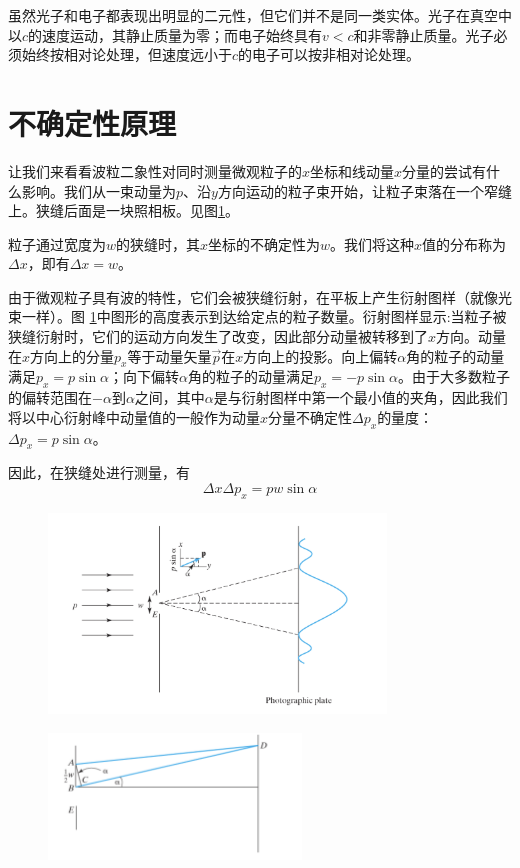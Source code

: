 	虽然光子和电子都表现出明显的二元性，但它们并不是同一类实体。光子在真空中以$c$的速度运动，其静止质量为零；而电子始终具有$v<c$和非零静止质量。光子必须始终按相对论处理，但速度远小于$c$的电子可以按非相对论处理。
	
	\section{不确定性原理}
	\label{sec:1.3 The Uncertainty Principle}
	让我们来看看波粒二象性对同时测量微观粒子的$x$坐标和线动量$x$分量的尝试有什么影响。我们从一束动量为$p$、沿$y$方向运动的粒子束开始，让粒子束落在一个窄缝上。狭缝后面是一块照相板。见图\ref{fig:1.1}。

	粒子通过宽度为$w$的狭缝时，其$x$坐标的不确定性为$w$。我们将这种$x$值的分布称为$\Delta x$，即有$\Delta x = w$。

	由于微观粒子具有波的特性，它们会被狭缝衍射，在平板上产生衍射图样（就像光束一样）。图 \ref{fig:1.1}中图形的高度表示到达给定点的粒子数量。衍射图样显示:当粒子被狭缝衍射时，它们的运动方向发生了改变，因此部分动量被转移到了$x$方向。动量在$x$方向上的分量$p_x$等于动量矢量$\overrightarrow{p}$在$x$方向上的投影。向上偏转$\alpha$角的粒子的动量满足$p_x=p\sin \alpha$；向下偏转$\alpha$角的粒子的动量满足$p_x=-p \sin \alpha$。由于大多数粒子的偏转范围在$-\alpha$到$\alpha$之间，其中$\alpha$是与衍射图样中第一个最小值的夹角，因此我们将以中心衍射峰中动量值的一般作为动量$x$分量不确定性$\Delta p_x$的量度：$\Delta p_x = p \sin \alpha$。

	因此，在狭缝处进行测量，有
	\begin{equation}
		\Delta x \Delta p_x = pw \sin \alpha 
		\label{eq:1.6 diffract equation on x}
	\end{equation}
	
	\begin{figure}[h!]
		\centering
		\includegraphics[width=0.8\textwidth]{Figures/1.1.png}  %
		\caption{}
		\label{fig:1.1}
	\end{figure}
	\begin{figure}[h!]
		\centering
		\includegraphics[width=0.6\textwidth]{Figures/1.2.png}
		\caption{}
		\label{fig:1.2}
	\end{figure}
	
